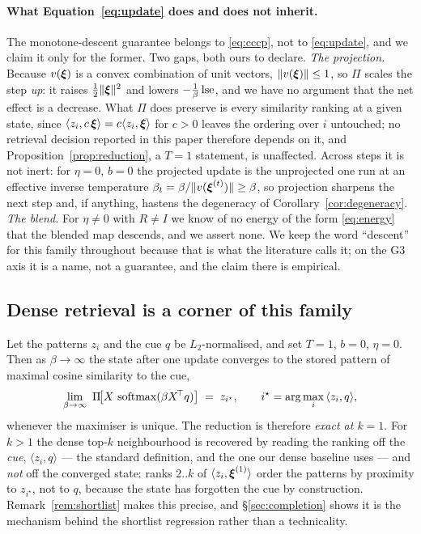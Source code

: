 \paragraph{What Equation~\eqref{eq:update} does and does not inherit.} The monotone-descent
guarantee belongs to \eqref{eq:cccp}, not to \eqref{eq:update}, and we claim it only for the
former. Two gaps, both ours to declare. \emph{The projection.} Because $v(\boldsymbol{\xi})$ is a convex
combination of unit vectors, $\|v(\boldsymbol{\xi})\| \le 1$, so $\Pi$ scales the step \emph{up}: it
raises $\tfrac12\|\boldsymbol{\xi}\|^2$ and lowers $-\tfrac1\beta\operatorname{lse}$, and we have no argument that the
net effect is a decrease. What $\Pi$ does preserve is every similarity ranking at a given
state, since $\langle z_i, c\,\boldsymbol{\xi}\rangle = c\langle z_i,\boldsymbol{\xi}\rangle$ for $c>0$ leaves the
ordering over $i$ untouched; no retrieval decision reported in this paper therefore depends
on it, and Proposition~\ref{prop:reduction}, a $T{=}1$ statement, is unaffected. Across steps
it is not inert: for $\eta{=}0$, $b{=}0$ the projected update is the unprojected one run at an
effective inverse temperature $\beta_t = \beta/\|v(\boldsymbol{\xi}^{(t)})\| \ge \beta$, so projection
sharpens the next step and, if anything, hastens the degeneracy of
Corollary~\ref{cor:degeneracy}. \emph{The blend.} For $\eta \neq 0$ with $R \neq I$ we know of
no energy of the form \eqref{eq:energy} that the blended map descends, and we assert none. We
keep the word ``descent'' for this family throughout because that is what the literature
calls it; on the G3 axis it is a name, not a guarantee, and the claim there is empirical.

\subsection{Dense retrieval is a corner of this family}

\begin{proposition}
\label{prop:reduction}
Let the patterns $z_i$ and the cue $q$ be $L_2$-normalised, and set $T=1$, $b=0$, $\eta=0$.
Then as $\beta\to\infty$ the state after one update converges to the stored pattern of
maximal cosine similarity to the cue,
\[
\lim_{\beta\to\infty}\ \Pi\!\big[X\,\operatorname{softmax}(\beta X^{\!\top} q)\big] \;=\; z_{i^\star},
\qquad i^\star = \arg\max_i\, \langle z_i, q\rangle ,
\]
whenever the maximiser is unique. The reduction is therefore \emph{exact at $k=1$}. For
$k>1$ the dense top-$k$ neighbourhood is recovered by reading the ranking off the
\emph{cue}, $\langle z_i,q\rangle$ --- the standard definition, and the one our dense
baseline uses --- and \emph{not} off the converged state: ranks $2..k$ of
$\langle z_i,\boldsymbol{\xi}^{(1)}\rangle$ order the patterns by proximity to $z_{i^\star}$, not to
$q$, because the state has forgotten the cue by construction. Remark~\ref{rem:shortlist}
makes this precise, and \S\ref{sec:completion} shows it is the mechanism behind the
shortlist regression rather than a technicality.
\end{proposition}

